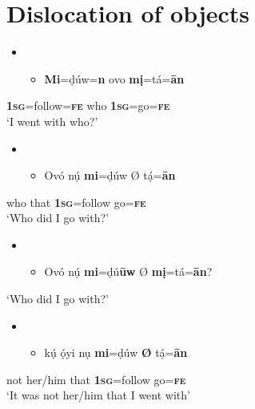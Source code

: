 \documentclass[output=paper]{langsci/langscibook}
\begin{document}
\chapter[Dislocation of objects]{Dislocation of objects}
\label{bkm:Ref406339397}\begin{itemize}
\item \setcounter{itemize}{0}
\begin{itemize}
\item \gll \textbf{Mi}=ḍúw=\textbf{n }    ovo     \textbf{mị}=tá=\textbf{\={a}n}\\
\end{itemize}
\end{itemize}
     \textbf{  }\textbf{1}\textbf{\textsc{sg}}=follow=\textbf{\textsc{fe}}   who   \textbf{1}\textbf{\textsc{sg}}=go=\textbf{\textsc{fe}}\\
\glt ‘I went with who?’
\z

\begin{itemize}
\item \setcounter{itemize}{0}
\begin{itemize}
\item \gll Ovó   nụ́   \textbf{mi}=ḍúw    Ø  tạ́=\textbf{\={a}n}\\
\end{itemize}
\end{itemize}
     \textbf{  }who   that   \textbf{1}\textbf{\textsc{sg}}=follow     go=\textbf{\textsc{fe}}\\
\glt ‘Who did I go with?’
\z

\begin{itemize}
\item \setcounter{itemize}{0}
\begin{itemize}
\item \gll *Ovó nụ́ \textbf{mi}=ḍú\textbf{\={u}w} Ø \textbf{mị}=tá=\textbf{\={a}n}?\\
\end{itemize}
\end{itemize}
\glt ‘Who did I go with?’
\z

\begin{itemize}
\item \setcounter{itemize}{0}
\begin{itemize}
\item \gll kụ́   ọ́yi     nụ     \textbf{mi}=ḍúw   \textbf{Ø}  tạ́=\textbf{\={a}n}\\
\end{itemize}
\end{itemize}
       not   her/him   that     \textbf{\textsc{1sg}}=follow     go=\textbf{\textsc{fe}}\\
\glt ‘It was not her/him that I went with’ 
\z
\end{document}
